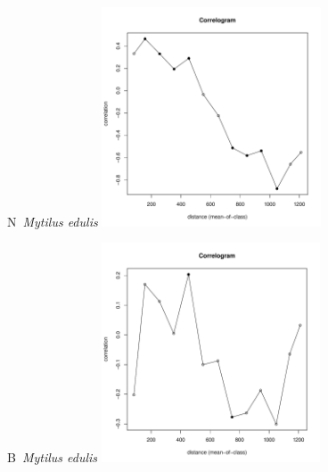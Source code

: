 \documentclass[12pt, a4paper]{disser}
\begin{document}
	\begin{figure}[h]

	\begin{minipage}[b]{.46\linewidth}
	\begin{center}
	{\small N~{\it Mytilus edulis}}
		\includegraphics[width=65mm]{../Barenc_Sea/distribution_Moran/Yarnyshnaya07_moran_N_Mytilus_edulis_.pdf}
	\end{center}
	\end{minipage}
%
	\hfil %
%
	\begin{minipage}[b]{.46\linewidth}
	\begin{center}
	{\small B~{\it Mytilus edulis}}
		\includegraphics[width=65mm]{../Barenc_Sea/distribution_Moran/Yarnyshnaya07_moran_B_Mytilus_edulis_.pdf}
	\end{center}
	\end{minipage}

	


\end{figure}
\end{document}
